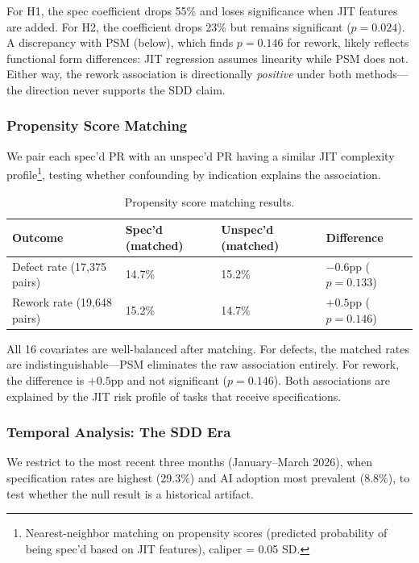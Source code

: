 \documentclass[a4paper,UKenglish,cleveref,autoref,thm-restate]{lipics-v2021}
\begin{document}
For H1, the spec coefficient drops 55\% and loses significance when JIT features are added. For H2, the coefficient drops 23\% but remains significant ($p = 0.024$). A discrepancy with PSM (below), which finds $p = 0.146$ for rework, likely reflects functional form differences: JIT regression assumes linearity while PSM does not. Either way, the rework association is directionally \emph{positive} under both methods---the direction never supports the SDD claim.

\subsubsection{Propensity Score Matching}

We pair each spec'd PR with an unspec'd PR having a similar JIT complexity profile\footnote{Nearest-neighbor matching on propensity scores (predicted probability of being spec'd based on JIT features), caliper = 0.05 SD.}, testing whether confounding by indication explains the association.

\begin{table}[t]
\centering
\caption{Propensity score matching results.}
\label{tab:psm}
\begin{tabular}{@{}llll@{}}
\toprule
\textbf{Outcome} & \textbf{Spec'd (matched)} & \textbf{Unspec'd (matched)} & \textbf{Difference} \\
\midrule
Defect rate (17,375 pairs) & 14.7\% & 15.2\% & $-0.6$pp ($p = 0.133$) \\
Rework rate (19,648 pairs) & 15.2\% & 14.7\% & $+0.5$pp ($p = 0.146$) \\
\bottomrule
\end{tabular}
\end{table}

All 16 covariates are well-balanced after matching. For defects, the matched rates are indistinguishable---PSM eliminates the raw association entirely. For rework, the difference is $+0.5$pp and not significant ($p = 0.146$). Both associations are explained by the JIT risk profile of tasks that receive specifications.

\subsubsection{Temporal Analysis: The SDD Era}

We restrict to the most recent three months (January--March 2026), when specification rates are highest (29.3\%) and AI adoption most prevalent (8.8\%), to test whether the null result is a historical artifact.
\end{document}
